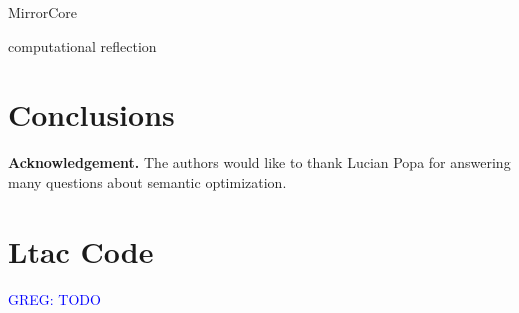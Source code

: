 \documentclass[preprint]{sigplanconf}
\newcommand{\greg}[1]{\textcolor{blue}{GREG: #1}}
\begin{document}
MirrorCore~\cite{malecha2014thesis}

computational reflection~\cite{}

\section{Conclusions}




{\bf Acknowledgement.}  The authors would like to thank Lucian Popa for answering many questions about semantic optimization.




\appendix
\section{Ltac Code}

\greg{TODO}
\end{document}
